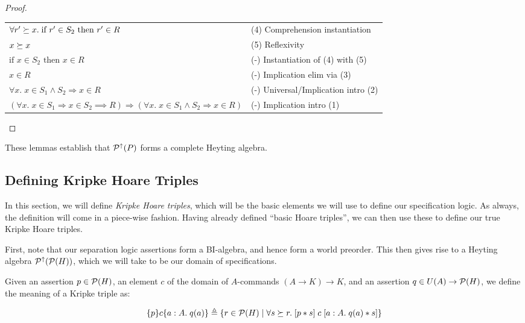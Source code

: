 \begin{proof}
\begin{tabular}{ll}
$\forall r' \succeq x.\; \mbox{if } r' \in S_2 \mbox{ then } r' \in R$ &
(4) Comprehension instantiation  \\

$x \succeq x$ & 
(5) Reflexivity  \\

$\mbox{if } x \in S_2 \mbox{ then } x \in R$ & 
(-) Instantiation of (4) with (5) \\

$x \in R$ & 
(-) Implication elim via (3) \\

$\forall x.\; x \in S_1 \land S_2 \Rightarrow x \in R$ & 
(-) Universal/Implication intro (2) \\

$(\forall x.\; x \in S_1 \Rightarrow x \in S_2 \implies R) \Rightarrow (\forall x.\; x \in S_1 \land S_2 \Rightarrow x \in R)$ & 
(-) Implication intro (1) \\
\end{tabular}
\end{proof}

These lemmas establish that $\mathcal{P}^{\uparrow}({P})$ forms a complete Heyting algebra. 

\subsection{Defining Kripke Hoare Triples}

In this section, we will define \emph{Kripke Hoare triples}, which
will be the basic elements we will use to define our specification
logic. As always, the definition will come in a piece-wise
fashion. Having already defined ``basic Hoare triples'', we can then
use these to define our true Kripke Hoare triples.

First, note that our separation logic assertions form a BI-algebra,
and hence form a world preorder. This then gives rise to a Heyting
algebra $\mathcal{P}^{\uparrow}({\mathcal{P}(H)})$, which we will take to be our domain of
specifications.

Given an assertion $p \in \mathcal{P}(H)$, an element $c$ of the domain
of $A$-commands $(A \to K) \to K$, and an assertion $q \in U(A) \to
\mathcal{P}(H)$, we define the meaning of a Kripke triple as:

\begin{displaymath}
  \{{p}\}{c}\{{a:A}.\;{q(a)}\} \triangleq
    \{{{ r \in \mathcal{P}(H) }\;|\;{\forall s \succeq r.\; [{p * s}]\;{c}\;[{a:A}.\;{q(a) * s}]}}\}
\end{displaymath}

